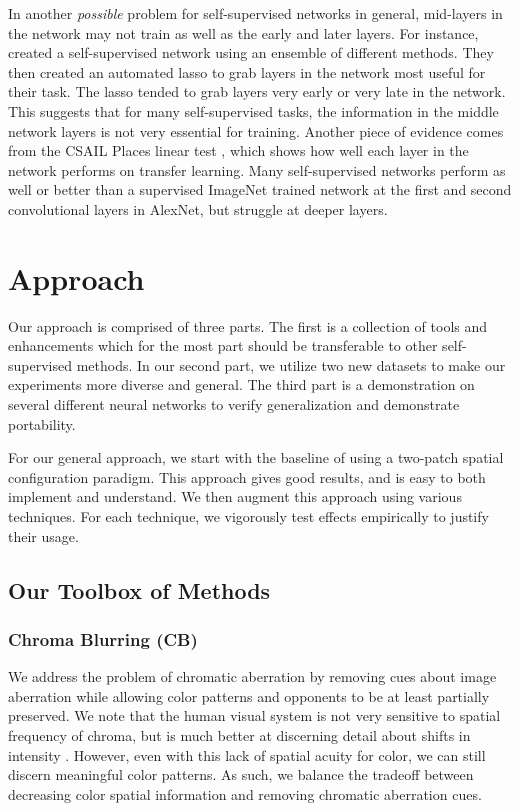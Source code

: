 \documentclass[10pt,twocolumn,letterpaper]{article}
\begin{document}
In another \emph{possible} problem for self-supervised networks in general, mid-layers in the network may not train as well as the early and later layers.  For instance, \cite{Doersch17} created a self-supervised network using an ensemble of different methods. They then created an automated lasso to grab layers in the network most useful for their task. The lasso tended to grab layers very early or very late in the network. This suggests that for many self-supervised tasks, the information in the middle network layers is not very essential for training. Another piece of evidence comes from the CSAIL Places linear test \cite{Zhang17,Zhang16}, which shows how well each layer in the network performs on transfer learning. Many self-supervised networks perform as well or better than a supervised ImageNet trained network at the first and second convolutional layers in AlexNet, but struggle at deeper layers. 


\section{Approach}

Our approach is comprised of three parts. The first is a collection of tools and enhancements which for the most part should be transferable to other self-supervised methods. In our second part, we utilize two new datasets to make our experiments more diverse and general. The third part is a demonstration on several different neural networks to verify generalization and demonstrate portability.

For our general approach, we start with the baseline of \cite{Doersch15} using a two-patch spatial configuration paradigm. This approach gives good results, and is easy to both implement and understand. We then augment this approach using various techniques. For each technique, we vigorously test effects empirically to justify their usage.

\subsection{Our Toolbox of Methods}

\subsubsection{Chroma Blurring (CB)}

We address the problem of chromatic aberration by removing cues about image aberration while allowing color patterns and opponents to be at least partially preserved. We note that the human visual system is not very sensitive to spatial frequency of chroma, but is much better at discerning detail about shifts in intensity \cite{Livingstone02}. However, even with this lack of spatial acuity for color, we can still discern meaningful color patterns. As such, we balance the tradeoff between decreasing color spatial information and removing chromatic aberration cues.
\end{document}
